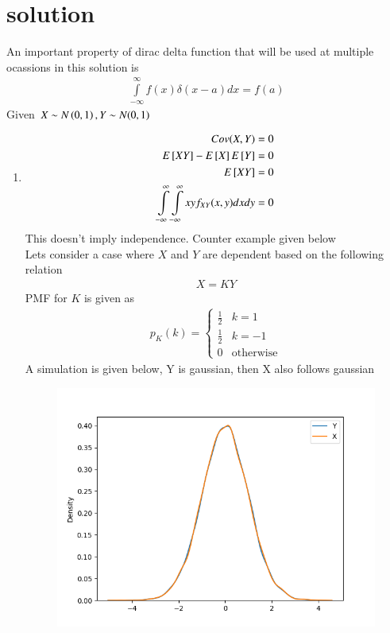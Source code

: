 \documentclass[journal,12pt,twocolumn]{IEEEtran}
\begin{document}
\section{solution}
An important property of dirac delta function that will be used at multiple ocassions in this solution is
\begin{align}
\displaystyle\int\limits_{-\infty}^{\infty} f(x)\delta(x-a)dx=f(a) \label{eq:dirac}
\end{align}
Given $X\sim N\left(0,1\right), Y\sim N(0,1)$
\begin{enumerate}
\item
\begin{align}
Cov(X,Y)=0\\
E{}\left[XY\right]-E{}\left[X\right]E{}\left[Y\right]=0\\
E{}\left[XY\right]=0\\
\displaystyle \int\limits_{-\infty}^{\infty} \int\limits_{-\infty}^{\infty}xyf_{XY}(x,y) dxdy=0
\end{align}
This doesn't imply independence. Counter example given below\\
Lets consider a case where $X$ and $Y$ are dependent based on the following relation
\begin{align}
X=KY \label{eq:case}
\end{align}
PMF for $K$ is given as
\begin{align}
p_K(k)=
\begin{cases}
\frac{1}{2} &k=1\\
\frac{1}{2} & k=-1\\
0 & \text{otherwise}
\end{cases}
\end{align}
A simulation is given below, Y is gaussian, then X also follows gaussian
\begin{figure}[H]
\centering
\includegraphics[width=\linewidth]{figure/fig}

\end{figure}
\end{enumerate}
\end{document}
